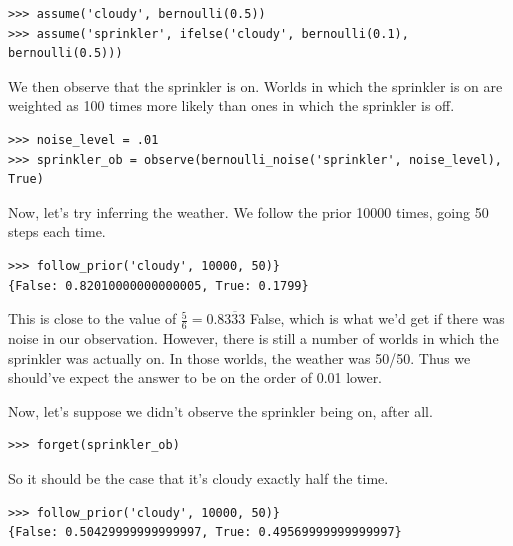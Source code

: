 \documentclass[11pt]{article}
\begin{document}
\begin{small}
\begin{verbatim}
>>> assume('cloudy', bernoulli(0.5))
>>> assume('sprinkler', ifelse('cloudy', bernoulli(0.1), bernoulli(0.5)))
\end{verbatim}
\end{small}

\noindent We then observe that the sprinkler is on.  Worlds in which the sprinkler is on are weighted as 100 times more likely than ones in which the sprinkler is off.  

\begin{small}
\begin{verbatim}
>>> noise_level = .01
>>> sprinkler_ob = observe(bernoulli_noise('sprinkler', noise_level), True)
\end{verbatim}
\end{small}

\noindent Now, let's try inferring the weather.  We follow the prior 10000 times, going 50 steps each time.  

\begin{small}
\begin{verbatim}
>>> follow_prior('cloudy', 10000, 50)}
{False: 0.82010000000000005, True: 0.1799}
\end{verbatim}
\end{small}

This is close to the value of $\frac{5}{6} = 0.8\overline{333}$ False, which is what we'd get if there was noise in our observation.  However, there is still a number of worlds in which the sprinkler was actually on.  In those worlds, the weather was 50/50.  Thus we should've expect the answer to be on the order of 0.01 lower.  \vspace{6 pt}

Now, let's suppose we didn't observe the sprinkler being on, after all.


\begin{small}
\begin{verbatim} 
>>> forget(sprinkler_ob)
\end{verbatim}
\end{small}

\noindent So it should be the case that it's cloudy exactly half the time.

\begin{small}
\begin{verbatim}
>>> follow_prior('cloudy', 10000, 50)}
{False: 0.50429999999999997, True: 0.49569999999999997}
\end{verbatim}
\end{small}
\end{document}
